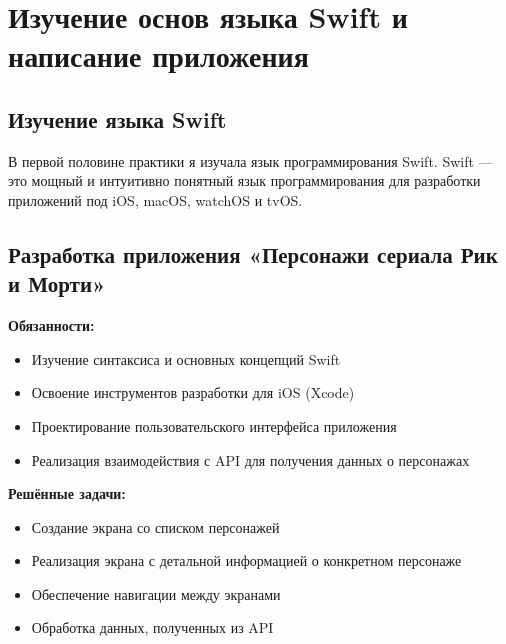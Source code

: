 
\section{Изучение основ языка Swift и написание приложения}
\subsection{Изучение языка Swift}
В первой половине практики я изучала язык программирования Swift. Swift — это мощный и интуитивно понятный язык программирования для разработки приложений под iOS, macOS, watchOS и tvOS.

\subsection{Разработка приложения «Персонажи сериала Рик и Морти»}
\textbf{Обязанности:}
\begin{itemize}
    \item Изучение синтаксиса и основных концепций Swift
    \item Освоение инструментов разработки для iOS (Xcode)
    \item Проектирование пользовательского интерфейса приложения
    \item Реализация взаимодействия с API для получения данных о персонажах
\end{itemize}

\textbf{Решённые задачи:}
\begin{itemize}
    \item Создание экрана со списком персонажей
    \item Реализация экрана с детальной информацией о конкретном персонаже
    \item Обеспечение навигации между экранами
    \item Обработка данных, полученных из API
\end{itemize}


